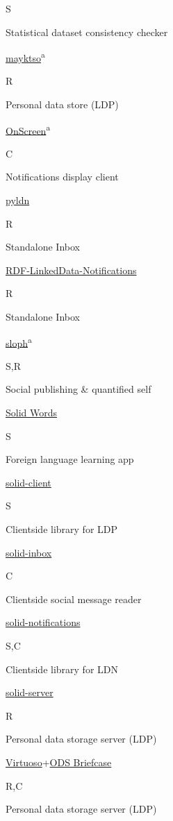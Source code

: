 \documentclass[]{article}
\begin{document}
S

Statistical dataset consistency checker

\href{https://github.com/csarven/mayktso}{mayktso}\textsuperscript{a}

R

Personal data store (LDP)

\href{https://github.com/rhiaro/onscreen}{OnScreen}\textsuperscript{a}

C

Notifications display client

\href{https://github.com/albertmeronyo/pyldn}{pyldn}

R

Standalone Inbox

\href{https://github.com/kjetilk/p5-rdf-linkeddata-notifications}{RDF-LinkedData-Notifications}

R

Standalone Inbox

\href{https://github.com/rhiaro/sloph}{sloph}\textsuperscript{a}

S,R

Social publishing \& quantified self

\href{https://github.com/melvincarvalho/vocab}{Solid Words}

S

Foreign language learning app

\href{https://github.com/solid/solid-client}{solid-client}

S

Clientside library for LDP

\href{https://github.com/solid/solid-inbox}{solid-inbox}

C

Clientside social message reader

\href{https://github.com/solid/solid-notifications}{solid-notifications}

S,C

Clientside library for LDN

\href{https://github.com/solid/node-solid-server}{solid-server}

R

Personal data storage server (LDP)

\href{https://github.com/openlink/virtuoso-opensource}{Virtuoso}+\href{http://ods.openlinksw.com/wiki/ODS/OdsBriefcase}{ODS
Briefcase}

R,C

Personal data storage server (LDP)
\end{document}
